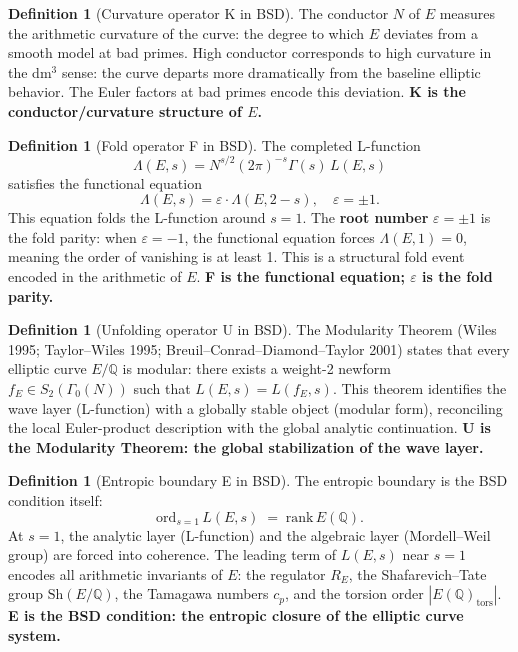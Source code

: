 \documentclass[14pt, twoside, openright]{book}
\newcommand{\Sha}{\mathrm{Sh}}
\theoremstyle{definition}
\newtheorem{definition}[theorem]{Definition}
\theoremstyle{remark}
\begin{document}
\begin{definition}[Curvature operator K in BSD]
The conductor $N$ of $E$ measures the arithmetic curvature of the curve: the
degree to which $E$ deviates from a smooth model at bad primes. High conductor
corresponds to high curvature in the dm$^{3}$ sense: the curve departs more
dramatically from the baseline elliptic behavior. The Euler factors at bad primes
encode this deviation. \textbf{K is the conductor/curvature structure of $E$.}
\end{definition}

\begin{definition}[Fold operator F in BSD]
The completed L-function
\[
  \Lambda(E, s) = N^{s/2} (2\pi)^{-s} \Gamma(s)\, L(E, s)
\]
satisfies the functional equation
\[
  \Lambda(E, s) = \varepsilon \cdot \Lambda(E, 2 - s),
  \quad \varepsilon = \pm 1.
\]
This equation folds the L-function around $s = 1$. The \textbf{root number}
$\varepsilon = \pm 1$ is the fold parity: when $\varepsilon = -1$, the functional
equation forces $\Lambda(E, 1) = 0$, meaning the order of vanishing is at least 1.
This is a structural fold event encoded in the arithmetic of $E$.
\textbf{F is the functional equation; $\varepsilon$ is the fold parity.}
\end{definition}

\begin{definition}[Unfolding operator U in BSD]
The Modularity Theorem (Wiles 1995; Taylor--Wiles 1995; Breuil--Conrad--Diamond--Taylor
2001) states that every elliptic curve $E/\mathbb{Q}$ is modular: there exists a
weight-2 newform $f_E \in S_2(\Gamma_0(N))$ such that $L(E,s) = L(f_E, s)$.
This theorem identifies the wave layer (L-function) with a globally stable object
(modular form), reconciling the local Euler-product description with the global
analytic continuation. \textbf{U is the Modularity Theorem: the global
stabilization of the wave layer.}
\end{definition}

\begin{definition}[Entropic boundary E in BSD]
The entropic boundary is the BSD condition itself:
\[
  \mathrm{ord}_{s=1}\, L(E,s) \;=\; \mathrm{rank}\, E(\mathbb{Q}).
\]
At $s = 1$, the analytic layer (L-function) and the algebraic layer (Mordell--Weil
group) are forced into coherence. The leading term of $L(E,s)$ near $s = 1$
encodes all arithmetic invariants of $E$: the regulator $R_E$, the
Shafarevich--Tate group $\Sha(E/\mathbb{Q})$, the Tamagawa numbers $c_p$, and the
torsion order $|E(\mathbb{Q})_{\mathrm{tors}}|$. \textbf{E is the BSD condition:
the entropic closure of the elliptic curve system.}
\end{definition}
\end{document}
